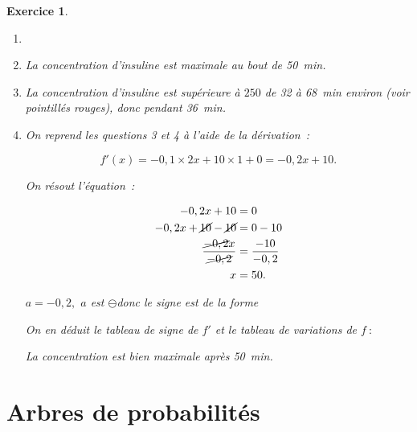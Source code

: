 \documentclass[10pt]{article}
\newtheorem{exo}{Exercice}
\begin{document}
\begin{exo}
\begin{enumerate}
\item ~{}

\begin{center}
\end{center}
\item La concentration d'insuline est maximale au bout de 50~min.
\item La concentration d'insuline est supérieure à $250$ de 32 à 68~min environ (voir pointillés rouges), donc pendant 36~min.
\item On reprend les questions 3 et 4 à l'aide de la dérivation~:

\[f'(x)=-0,1\times 2x+10\times 1+0=-0,2x+10.\]

On résout l'équation~:

\begin{align*}-0,2x+10&=0\\
 -0,2x+\cancel{10}-\cancel{10}&=0-10\\
 \frac{\cancel{-0,2}x}{\cancel{-0,2}}&=\frac{-10}{-0,2}\\
 x&=50.
 \end{align*}

$a=-0,2,$ $a$ est \Large $\ominus$\normalsize donc le signe est de la forme \fbox{$+~\upphi~-$}

\medskip


On en déduit le tableau de signe de $f'$ et le tableau de variations de $f~:$


\medskip

\begin{center}
\end{center}

\medskip

La concentration est bien maximale après 50~min.

\end{enumerate}

\end{exo}


\section{Arbres de probabilités}
\end{document}
